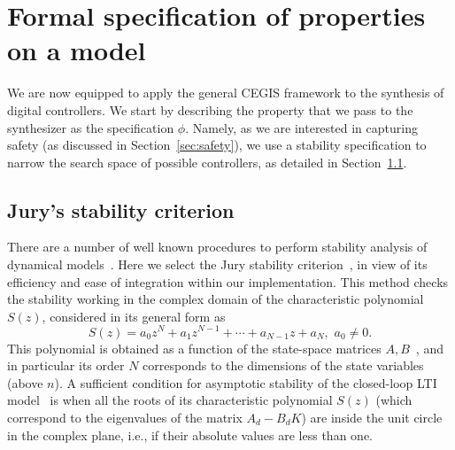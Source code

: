 \section{Formal specification of properties on a model} 
\label{sec:specification}

We are now equipped to apply the general CEGIS framework to the synthesis of digital controllers. 
We start by describing the property that we pass to the synthesizer as the specification $\phi$. 
Namely, as we are interested in capturing safety (as discussed in Section~\ref{sec:safety}),  
we use a stability specification to narrow the search space of possible controllers, as detailed in Section~\ref{ssec:stabspecification}.

\subsection{Jury's stability criterion} 
\label{ssec:stabspecification}


There are a number of well known procedures to perform stability analysis of dynamical models~\cite{Astrom08}. 
Here we select the Jury stability criterion~\cite{astrom1997computer}, 
in view of its efficiency and ease of integration within our implementation.  
This method checks the stability working in the complex domain of the characteristic polynomial $S(z)$,  
%
%
considered in its general form as 
%
\begin{equation*}
S(z) = a_0z^N+a_1z^{N-1}+\cdots+a_{N-1}z+a_N,\,\, a_0\neq0. 
\end{equation*}
This polynomial is obtained as a function of the state-space matrices $A,B$~\cite{Astrom08}, 
and in particular its order $N$ corresponds to the dimensions of the state variables (above $n$).  
A sufficient condition for asymptotic stability of the closed-loop LTI model~\cite{astrom1997computer} 
is when all the roots of its characteristic polynomial $S(z)$ (which correspond to the 
eigenvalues of the matrix $A_d-B_dK$) are inside the unit circle in the complex plane, 
i.e., if their absolute values are less than one. 

